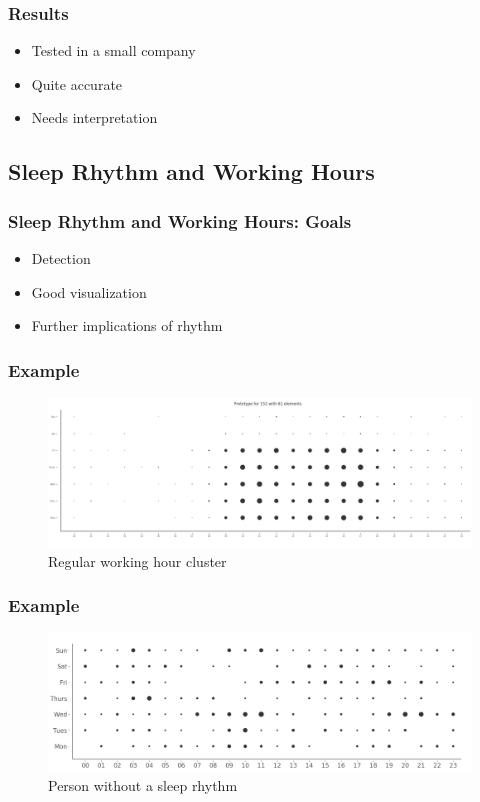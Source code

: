 \documentclass{beamer}
\begin{document}
\begin{frame}
    \frametitle{Results}
    \begin{itemize}
        \item Tested in a small company
        \pause{}
        \item Quite accurate
        \pause{}
        \item Needs interpretation
    \end{itemize}
\end{frame}

\subsection{Sleep Rhythm and Working Hours}
\begin{frame}
    \frametitle{Sleep Rhythm and Working Hours: Goals}
    \begin{itemize}
        \item Detection
        \pause{}
        \item Good visualization
        \pause{}
        \item Further implications of rhythm
    \end{itemize}
\end{frame}

\begin{frame}
    \frametitle{Example}
    \begin{figure}[H]
        \includegraphics[scale=0.22]{analysis-affinity/152}
        \centering
        \caption{Regular working hour cluster}
    \end{figure}
\end{frame}

\begin{frame}
    \frametitle{Example}
    \begin{figure}[H]
        \includegraphics[scale=0.22]{analysis/random-punchcard}
        \centering
        \caption{Person without a sleep rhythm}
    \end{figure}
\end{frame}
\end{document}
